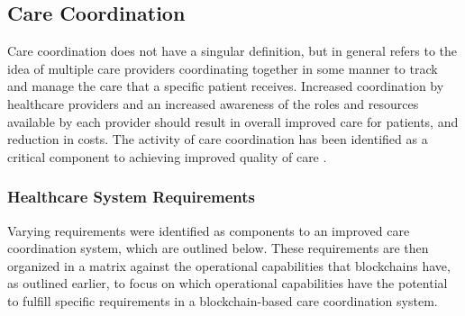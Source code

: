 \documentclass[12pt]{report}
\begin{document}
\subsection{Care Coordination}
Care coordination does not have a singular definition, but in general refers to the idea of multiple care providers coordinating together in some manner to track and manage the care that a specific patient receives. Increased coordination by healthcare providers and an increased awareness of the roles and resources available by each provider should result in overall improved care for patients, and reduction in costs. The activity of care coordination has been identified as a critical component to achieving improved quality of care \cite{Schultz.2014}.

\subsubsection{Healthcare System Requirements}
\label{sec:reqrx}
Varying requirements were identified as components to an improved care coordination system, which are outlined below. These requirements are then organized in a matrix against the operational capabilities that blockchains have, as outlined earlier, to focus on which operational capabilities have the potential to fulfill specific requirements in a blockchain-based care coordination system. 
\end{document}
